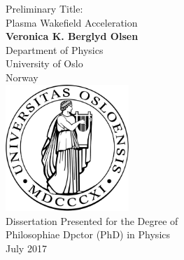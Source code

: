 \begin{titlepage}
    \begin{center}
        \vspace*{10mm}
        \huge{}
        Preliminary Title:\\
        Plasma Wakefield Acceleration\\
        \vspace{20mm}
        \large
        \textbf{Veronica K. Berglyd Olsen}\\
        Department of Physics\\
        University of Oslo\\
        Norway\\
        \vfill
        \includegraphics[width=0.35\textwidth]{Images/UiOLogo.pdf}\\
        \vspace{20mm}
        Dissertation Presented for the Degree of\\
        Philosophiae Dpctor (PhD) in Physics\\
        \vspace{10mm}
        \large{July 2017}
    \end{center}
\end{titlepage}
